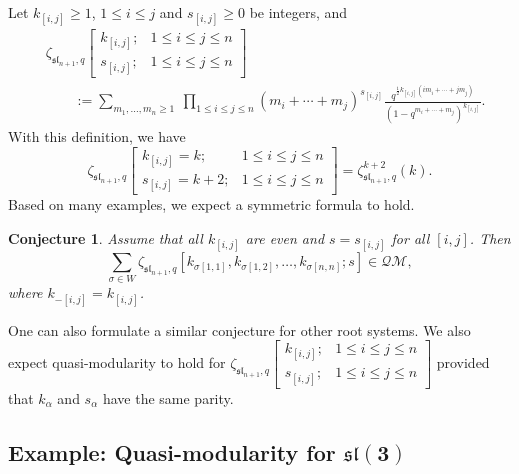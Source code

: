 \documentclass[10pt,a4paper]{amsart}
\numberwithin{equation}{section}
\newtheorem{Conjecture}[Theorem]{Conjecture}
\theoremstyle{definition}
\begin{document}
Let $k_{[i,j]} \geq 1$, $1 \leq i \leq j$ and $s_{[i,j]} \geq 0$ be integers, and
\begin{align*}
 & \zeta_{\mathfrak{sl}_{n+1},q} \left[ \begin{matrix} k_{[i,j]}; & 1 \leq i \leq j \leq n \\ s_{[i,j]}; & 1 \leq i \leq j \leq n \end{matrix} \right]\nonumber\\
 &\qquad :=\sum_{m_1,\dots,m_n \geq 1} \ \prod_{1 \leq i \leq j \leq n} (m_i+\cdots + m_j)^{s_{[i,j]}} \frac{q^{\frac12 k_{[i,j]} (i m_i+\cdots + j m_j)}}{(1-q^{m_i+\cdots + m_j})^{k_{[i,j]}}}. \label{type-An-alt}
\end{align*}
With this definition, we have
\[
\zeta_{\mathfrak{sl}_{n+1},q} \left[ \begin{matrix} k_{[i,j]} =k; & 1 \leq i \leq j \leq n \\ s_{[i,j]} =k+2; & 1 \leq i \leq j \leq n \end{matrix} \right]
=\zeta_{\mathfrak{sl}_{n+1},q}^{k+2} (k).
\]
Based on many examples, we expect a symmetric formula to hold.

\begin{Conjecture} Assume that all $k_{[i,j]}$ are even and $s=s_{[i,j]}$ for all $[i,j]$. Then
\[
\sum_{\sigma \in W} \zeta_{\mathfrak{sl}_{n+1},q} \left[ k_{\sigma[1,1]},k_{\sigma[1,2]}, \dots, k_{\sigma[n,n]};s \right] \in \mathcal{QM},
\]
where $k_{-[i,j]}=k_{[i,j]}$.
\end{Conjecture}

One can also formulate a similar conjecture for other root systems.
We also expect quasi-modularity to hold for
$\zeta_{\mathfrak{sl}_{n+1},q} \left[ \begin{smallmatrix} k_{[i,j]}; & 1 \leq i \leq j \leq n \\ s_{[i,j]}; & 1 \leq i \leq j \leq n \end{smallmatrix} \right]$
provided that $k_{\alpha}$ and $s_{\alpha}$ have the same parity.


\subsection[Example: Quasi-modularity for sl(3)]{Example: Quasi-modularity for $\boldsymbol{\mathfrak{sl}(3)}$}\label{section3.5}
\end{document}
